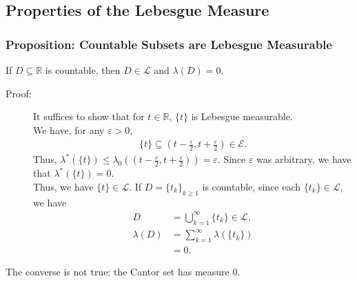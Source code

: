 \documentclass[9pt]{extarticle}
\newcommand{\R}{\mathbb{R}}
\begin{document}
  \subsection{Properties of the Lebesgue Measure}%
  \subsubsection{Proposition: Countable Subsets are Lebesgue Measurable}%
  If $D\subseteq \R$ is countable, then $D\in \mathcal{L}$ and $\lambda(D) = 0$.
  \begin{description}
    \item[Proof:] It suffices to show that for $t\in\R$, $\{t\}$ is Lebesgue measurable.\\

      We have, for any $\varepsilon > 0$,
      \begin{align*}
        \{t\}\subseteq \left(t-\frac{\varepsilon}{2},t+\frac{\varepsilon}{2}\right)\in \mathcal{E}.
      \end{align*}
      Thus, $\lambda^{\ast}(\{t\})\leq \lambda_{0}\left(\left(t-\frac{\varepsilon}{2},t+\frac{\varepsilon}{2}\right)\right) = \varepsilon$. Since $\varepsilon$ was arbitrary, we have that $\lambda^{\ast}(\{t\}) = 0$.\\

      Thus, we have $\{t\}\in\mathcal{L}$. If $D = \{t_k\}_{k\geq 1}$ is countable, since each $\{t_k\}\in\mathcal{L}$, we have
      \begin{align*}
        D &= \bigcup_{k=1}^{\infty}\{t_k\}\in \mathcal{L},\\
        \lambda(D) &= \sum_{k=1}^{\infty}\lambda(\{t_k\})\\
                   &= 0.
      \end{align*}
  \end{description}
  The converse is not true: the Cantor set has measure $0$.
\end{document}
